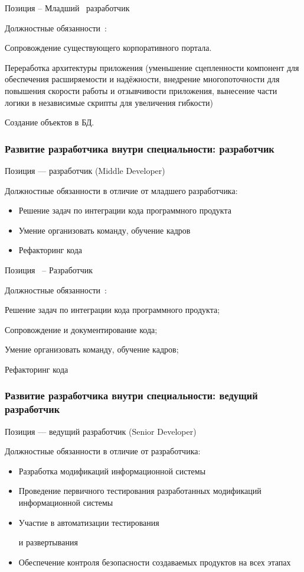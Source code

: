 \documentclass{../industrial-development}
\begin{document}
\lecturenotes

Позиция – Младший~\cite{itcf} разработчик~\cite{hh}

Должностные обязанности~\cite{rab}:

Сопровождение существующего корпоративного портала.

Переработка архитектуры приложения (уменьшение сцепленности компонент для обеспечения расширяемости и надёжности, внедрение многопоточности для повышения скорости работы и отзывчивости приложения, вынесение части логики в независимые скрипты для увеличения гибкости)

 
Создание объектов в БД.


\begin{frame} \frametitle{Развитие разработчика внутри специальности: разработчик}
 \begin{block}{}
  \alert{Позиция --- разработчик (Middle Developer)}

Должностные обязанности в отличие от младшего разработчика: 
  \end{block}
  \begin{itemize}
  \item Решение задач по интеграции кода программного продукта
  \item Умение организовать  команду, обучение кадров
  \item Рефакторинг кода
  \end{itemize}
\end{frame}

\lecturenotes

Позиция~\cite{hh} – Разработчик ~\cite{itcf}

Должностные обязанности~\cite{rab}:

Решение задач по интеграции кода программного продукта;

Сопровождение и документирование кода;

Умение организовать  команду, обучение кадров;

 Рефакторинг кода


\begin{frame} \frametitle{Развитие разработчика внутри специальности: ведущий разработчик}
 \begin{block}{}
  \alert{Позиция --- ведущий разработчик (Senior Developer)}

Должностные обязанности в отличие от разработчика: 
  \end{block}
  \begin{itemize}
  \item Разработка модификаций информационной системы
  \item Проведение первичного тестирования разработанных модификаций информационной системы
 \item  Участие в автоматизации тестирования 

и развертывания
  \item Обеспечение контроля безопасности создаваемых продуктов на всех этапах
  \end{itemize}
\end{frame}
\end{document}
